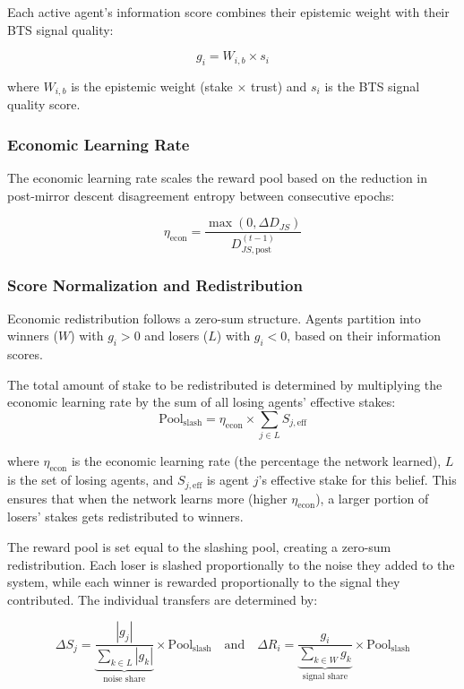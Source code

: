 \documentclass[11pt,a4paper]{article}
\begin{document}
Each active agent's information score combines their epistemic weight with their BTS signal quality:

$$g_i = W_{i,b} \times s_i$$

where $W_{i,b}$ is the epistemic weight (stake $\times$ trust) and $s_i$ is the BTS signal quality score.

\subsubsection*{Economic Learning Rate}

The economic learning rate scales the reward pool based on the reduction in post-mirror descent disagreement entropy between consecutive epochs:

$$\eta_{\text{econ}} = \frac{\max(0, \Delta D_{JS})}{D_{JS,\text{post}}^{(t-1)}}$$

\subsubsection*{Score Normalization and Redistribution}

Economic redistribution follows a zero-sum structure. Agents partition into winners ($W$) with $g_i > 0$ and losers ($L$) with $g_i < 0$, based on their information scores.

The total amount of stake to be redistributed is determined by multiplying the economic learning rate by the sum of all losing agents' effective stakes:
$$\text{Pool}_{\text{slash}} = \eta_{\text{econ}} \times \sum_{j \in L} S_{j,\text{eff}}$$

where $\eta_{\text{econ}}$ is the economic learning rate (the percentage the network learned), $L$ is the set of losing agents, and $S_{j,\text{eff}}$ is agent $j$'s effective stake for this belief. This ensures that when the network learns more (higher $\eta_{\text{econ}}$), a larger portion of losers' stakes gets redistributed to winners.

The reward pool is set equal to the slashing pool, creating a zero-sum redistribution. Each loser is slashed proportionally to the noise they added to the system, while each winner is rewarded proportionally to the signal they contributed. The individual transfers are determined by:

$$\Delta S_j = \underbrace{\frac{|g_j|}{\sum_{k \in L} |g_k|}}_{\text{noise share}} \times \text{Pool}_{\text{slash}} \quad \text{and} \quad \Delta R_i = \underbrace{\frac{g_i}{\sum_{k \in W} g_k}}_{\text{signal share}} \times \text{Pool}_{\text{slash}}$$
\end{document}
